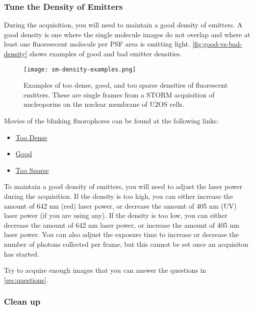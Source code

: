 \documentclass[10pt,a4paper,oneside]{book}
\begin{document}
\subsubsection{Tune the Density of Emitters}

During the acquisition, you will need to maintain a good density of emitters. A good density is one where the single molecule images do not overlap and where at least one fluoresecent molecule per PSF area is emitting light. \autoref{fig:good-vs-bad-density} shows examples of good and bad emitter densities.

\begin{figure}[ht]
    \centering
    \texttt{[image: sm-density-examples.png]}
    \caption{Examples of too dense, good, and too sparse densities of fluorescent emitters. These are single frames from a STORM acquisition of nucleoporins on the nuclear membrane of U2OS cells.}
    \label{fig:good-vs-bad-density}
\end{figure}

Movies of the blinking fluorophores can be found at the following links:

\begin{itemize}
    \item \href{https://drive.google.com/file/d/12zIK-BqMl0qttkYljKi7P9xZ3krMvthe/view?usp=sharing}{Too Dense}
    \item \href{https://drive.google.com/file/d/1Is4U-K297sku4u20OJqwY6IOUags1bLl/view?usp=sharing}{Good}
    \item \href{https://drive.google.com/file/d/1W2AxVjYirPj8t8d2__m8rNoNTUyM3RfY/view?usp=sharing}{Too Sparse}
\end{itemize}

To maintain a good density of emitters, you will need to adjust the laser power during the acquisition. If the density is too high, you can either increase the amount of 642 nm (red) laser power, or decrease the amount of 405 nm (UV) laser power (if you are using any). If the density is too low, you can either decrease the amount of 642 nm laser power, or increase the amount of 405 nm laser power. You can also adjust the exposure time to increase or decrease the number of photons collected per frame, but this cannot be set once an acquisiton has started.

Try to acquire enough images that you can answer the questions in \autoref{sec:questions}.

\subsubsection{Clean up}
\end{document}
